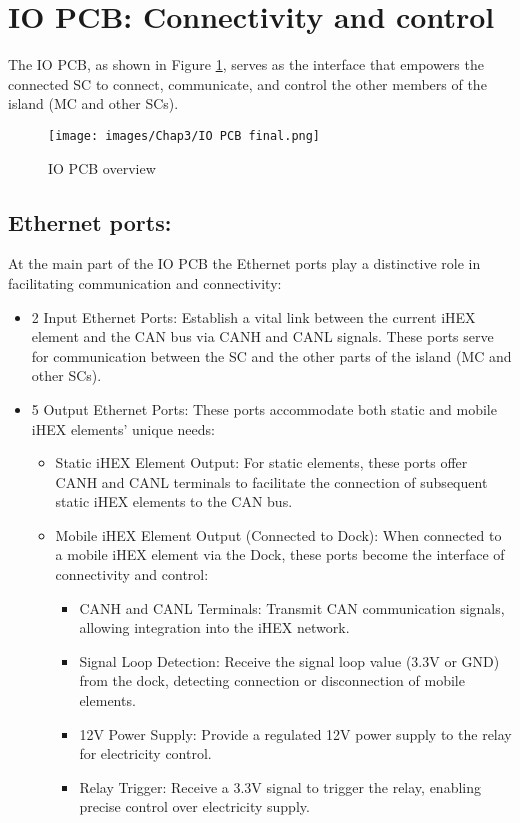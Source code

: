 \section{IO PCB: Connectivity and control}

The IO PCB, as shown in Figure \ref{IO PCB overview}, serves as the interface that empowers the connected SC to connect, communicate, and control the other members of the island (MC and other SCs).

\begin{figure}[H]
\begin{center}
\texttt{[image: images/Chap3/IO PCB final.png]}\\
\caption{IO PCB overview}
\label{IO PCB overview}
\end{center}
\end{figure}

\subsection{Ethernet ports:}
At the main part of the IO PCB the Ethernet ports play a distinctive role in facilitating communication and connectivity:

\begin{itemize}
    \item 2 Input Ethernet Ports: Establish a vital link between the current iHEX element and the CAN bus via CANH and CANL signals. These ports serve for communication between the SC and the other parts of the island (MC and other SCs).
    \item 5 Output Ethernet Ports: These ports accommodate both static and mobile iHEX elements' unique needs:
    \begin{itemize}
        \item Static iHEX Element Output: For static elements, these ports offer CANH and CANL terminals to facilitate the connection of subsequent static iHEX elements to the CAN bus.
        \item Mobile iHEX Element Output (Connected to Dock): When connected to a mobile iHEX element via the Dock, these ports become the interface of connectivity and control:
        \begin{itemize}
            \item CANH and CANL Terminals: Transmit CAN communication signals, allowing integration into the iHEX network.
            \item Signal Loop Detection: Receive the signal loop value (3.3V or GND) from the dock, detecting connection or disconnection of mobile elements.
            \item 12V Power Supply: Provide a regulated 12V power supply to the relay for electricity control.
            \item Relay Trigger: Receive a 3.3V signal to trigger the relay, enabling precise control over electricity supply.
        \end{itemize}
    \end{itemize}
\end{itemize}

